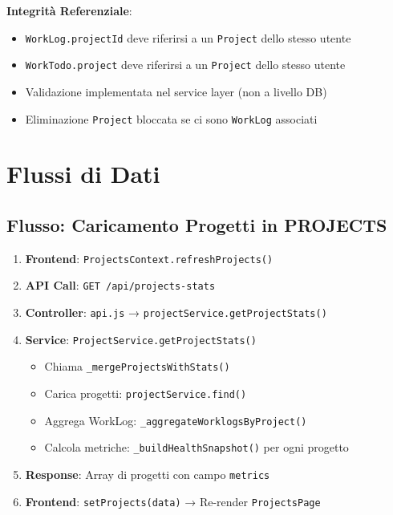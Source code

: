 \documentclass[11pt,a4paper]{article}
\begin{document}
\textbf{Integrità Referenziale}:
\begin{itemize}
    \item \texttt{WorkLog.projectId} deve riferirsi a un \texttt{Project} dello stesso utente
    \item \texttt{WorkTodo.project} deve riferirsi a un \texttt{Project} dello stesso utente
    \item Validazione implementata nel service layer (non a livello DB)
    \item Eliminazione \texttt{Project} bloccata se ci sono \texttt{WorkLog} associati
\end{itemize}

\newpage

\section{Flussi di Dati}

\subsection{Flusso: Caricamento Progetti in PROJECTS}

\begin{enumerate}
    \item \textbf{Frontend}: \texttt{ProjectsContext.refreshProjects()}
    \item \textbf{API Call}: \texttt{GET /api/projects-stats}
    \item \textbf{Controller}: \texttt{api.js} → \texttt{projectService.getProjectStats()}
    \item \textbf{Service}: \texttt{ProjectService.getProjectStats()}
    \begin{itemize}
        \item Chiama \texttt{\_mergeProjectsWithStats()}
        \item Carica progetti: \texttt{projectService.find()}
        \item Aggrega WorkLog: \texttt{\_aggregateWorklogsByProject()}
        \item Calcola metriche: \texttt{\_buildHealthSnapshot()} per ogni progetto
    \end{itemize}
    \item \textbf{Response}: Array di progetti con campo \texttt{metrics}
    \item \textbf{Frontend}: \texttt{setProjects(data)} → Re-render \texttt{ProjectsPage}
\end{enumerate}
\end{document}
